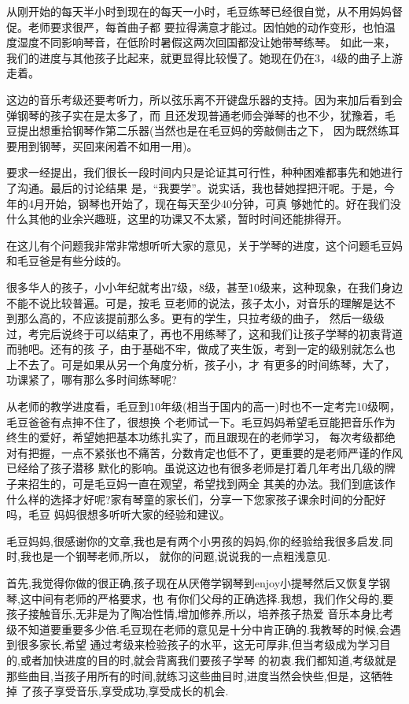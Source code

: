 \documentclass[11pt,a4paper,onecolumn]{article}
\begin{document}
从刚开始的每天半小时到现在的每天一小时，毛豆练琴已经很自觉，从不用妈妈督促。老师要求很严，每首曲子都
要拉得满意才能过。因怕她的动作变形，也怕温度湿度不同影响琴音，在低阶时暑假这两次回国都没让她带琴练琴。
如此一来，我们的进度与其他孩子比起来，就更显得比较慢了。她现在仍在3，4级的曲子上游走着。


这边的音乐考级还要考听力，所以弦乐离不开键盘乐器的支持。因为来加后看到会弹钢琴的孩子实在是太多了，而
且还发现普通老师会弹琴的也不少，犹豫着，毛豆提出想重拾钢琴作第二乐器(当然也是在毛豆妈的旁敲侧击之下，
因为既然练耳要用到钢琴，买回来闲着不如用一用)。


要求一经提出，我们很长一段时间内只是论证其可行性，种种困难都事先和她进行了沟通。最后的讨论结果
是，``我要学''。说实话，我也替她捏把汗呢。于是，今年的4月开始，钢琴也开始了，现在每天至少40分钟，可真
够她忙的。好在我们没什么其他的业余兴趣班，这里的功课又不太紧，暂时时间还能排得开。


在这儿有个问题我非常非常想听听大家的意见，关于学琴的进度，这个问题毛豆妈和毛豆爸是有些分歧的。


很多华人的孩子，小小年纪就考出7级，8级，甚至10级来，这种现象，在我们身边不能不说比较普遍。可是，按毛
豆老师的说法，孩子太小，对音乐的理解是达不到那么高的，不应该提前那么多。更有的学生，只拉考级的曲子，
然后一级级过，考完后说终于可以结束了，再也不用练琴了，这和我们让孩子学琴的初衷背道而驰吧。还有的孩
子，由于基础不牢，做成了夹生饭，考到一定的级别就怎么也上不去了。可是如果从另一个角度分析，孩子小，才
有更多的时间练琴，大了，功课紧了，哪有那么多时间练琴呢?


从老师的教学进度看，毛豆到10年级(相当于国内的高一)时也不一定考完10级啊，毛豆爸爸有点抻不住了，很想换
个老师试一下。毛豆妈妈希望毛豆能把音乐作为终生的爱好，希望她把基本功练扎实了，而且跟现在的老师学习，
每次考级都绝对有把握，一点不紧张也不痛苦，分数肯定也低不了，更重要的是老师严谨的作风已经给了孩子潜移
默化的影响。虽说这边也有很多老师是打着几年考出几级的牌子来招生的，可是毛豆妈一直在观望，希望找到两全
其美的办法。我们到底该作什么样的选择才好呢?家有琴童的家长们，分享一下您家孩子课余时间的分配好吗，毛豆
妈妈很想多听听大家的经验和建议。

毛豆妈妈,很感谢你的文章,我也是有两个小男孩的妈妈,你的经验给我很多启发.同时,我也是一个钢琴老师,所以，
就你的问题,说说我的一点粗浅意见.


首先,我觉得你做的很正确,孩子现在从厌倦学钢琴到enjoy小提琴然后又恢复学钢琴,这中间有老师的严格要求，也
有你们父母的正确选择.我想，我们作父母的,要孩子接触音乐,无非是为了陶冶性情,增加修养,所以，培养孩子热爱
音乐本身比考级不知道要重要多少倍.毛豆现在老师的意见是十分中肯正确的.我教琴的时候,会遇到很多家长,希望
通过考级来检验孩子的水平，这无可厚非,但当考级成为学习目的,或者加快进度的目的时,就会背离我们要孩子学琴
的初衷.我们都知道,考级就是那些曲目,当孩子用所有的时间,就练习这些曲目时,进度当然会快些,但是，这牺牲掉
了孩子享受音乐,享受成功,享受成长的机会.
\end{document}
